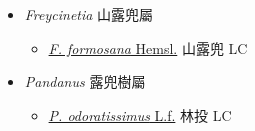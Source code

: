 
  \begin{itemize}
 \item[] \textit{Freycinetia} 山露兜屬
                                
  \begin{itemize}
        \item[] \href{http://www.theplantlist.org/tpl1.1/search?q=Freycinetia+formosana}{\textit{F. formosana} Hemsl.}   山露兜   LC
  \end{itemize}
 \item[] \textit{Pandanus} 露兜樹屬
                                
  \begin{itemize}
        \item[] \href{http://www.theplantlist.org/tpl1.1/search?q=Pandanus+odoratissimus}{\textit{P. odoratissimus} L.f.}   林投   LC
  \end{itemize}
  \end{itemize}
